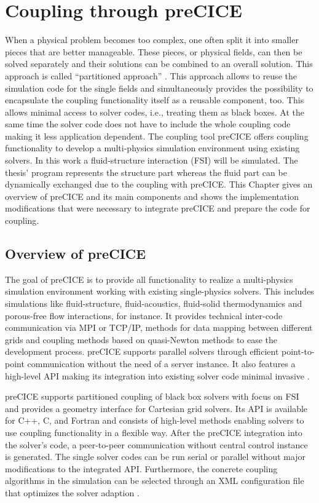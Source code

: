 \section{Coupling through preCICE}\label{sec:Coupl}
When a physical problem becomes too complex, one often split it into smaller pieces that are better manageable. These pieces, or physical fields, can then be solved separately and their solutions can be combined to an overall solution. This approach is called ``partitioned approach'' \cite{gatzhammer2015efficient}. This approach allows to reuse the simulation code for the single fields and simultaneously provides the possibility to encapsulate the coupling functionality itself as a reusable component, too. This allows minimal access to solver codes, i.e., treating them as black boxes. At the same time the solver code does not have to include the whole coupling code making it less application dependent. The coupling tool preCICE offers coupling functionality to develop a multi-physics simulation environment using existing solvers. In this work a fluid-structure interaction (FSI) will be simulated. The thesis' program represents the structure part whereas the fluid part can be dynamically exchanged due to the coupling with preCICE. This Chapter gives an overview of preCICE and its main components and shows the implementation modifications that were necessary to integrate preCICE and prepare the code for coupling.

 \subsection{Overview of preCICE}\label{sec:Coupl-OverviewPreCICE}
  The goal of preCICE is to provide all functionality to realize a multi-physics simulation environment working with existing single-physics solvers. This includes simulations like fluid-structure, fluid-acoustics, fluid-solid thermodynamics and porous-free flow interactions, for instance. It provides technical inter-code communication via MPI or TCP/IP, methods for data mapping between different grids and coupling methods based on quasi-Newton methods to ease the development process. preCICE supports parallel solvers through efficient point-to-point communication without the need of a server instance. It also features a high-level API making its integration into existing solver code minimal invasive \cite{bungartz2015fully}.
  
  preCICE supports partitioned coupling of black box solvers with focus on FSI and provides a geometry interface for Cartesian grid solvers. Its API is available for C++, C, and Fortran and consists of high-level methods enabling solvers to use coupling functionality in a flexible way. After the preCICE integration into the solver's code, a peer-to-peer communication without central control instance is generated. The single solver codes can be run serial or parallel without major modifications to the integrated API. Furthermore, the concrete coupling algorithms in the simulation can be selected through an XML configuration file that optimizes the solver adaption \cite{gatzhammer2015efficient}.
  
